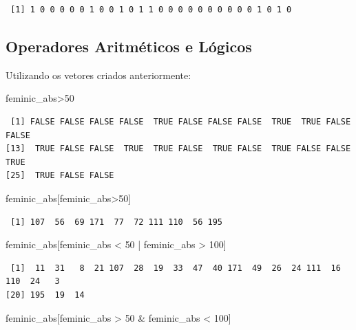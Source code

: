 \documentclass[
  letterpaper,
  DIV=11,
  numbers=noendperiod]{scrreprt}
\newenvironment{Shaded}{\begin{snugshade}}{\end{snugshade}}
\newcommand{\DecValTok}[1]{\textcolor[rgb]{0.68,0.00,0.00}{#1}}
\newcommand{\NormalTok}[1]{\textcolor[rgb]{0.00,0.23,0.31}{#1}}
\newcommand{\SpecialCharTok}[1]{\textcolor[rgb]{0.37,0.37,0.37}{#1}}
\begin{document}
\begin{verbatim}
 [1] 1 0 0 0 0 0 1 0 0 1 0 1 1 0 0 0 0 0 0 0 0 0 0 1 0 1 0
\end{verbatim}

\subsection{Operadores Aritméticos e
Lógicos}\label{operadores-aritmuxe9ticos-e-luxf3gicos}

Utilizando os vetores criados anteriormente:

\begin{Shaded}
\begin{Highlighting}[]
\NormalTok{feminic\_abs}\SpecialCharTok{\textgreater{}}\DecValTok{50}
\end{Highlighting}
\end{Shaded}

\begin{verbatim}
 [1] FALSE FALSE FALSE FALSE  TRUE FALSE FALSE FALSE  TRUE  TRUE FALSE FALSE
[13]  TRUE FALSE FALSE  TRUE  TRUE FALSE  TRUE FALSE  TRUE FALSE FALSE  TRUE
[25]  TRUE FALSE FALSE
\end{verbatim}

\begin{Shaded}
\begin{Highlighting}[]
\NormalTok{feminic\_abs[feminic\_abs}\SpecialCharTok{\textgreater{}}\DecValTok{50}\NormalTok{]}
\end{Highlighting}
\end{Shaded}

\begin{verbatim}
 [1] 107  56  69 171  77  72 111 110  56 195
\end{verbatim}

\begin{Shaded}
\begin{Highlighting}[]
\NormalTok{feminic\_abs[feminic\_abs }\SpecialCharTok{\textless{}} \DecValTok{50} \SpecialCharTok{|}\NormalTok{ feminic\_abs }\SpecialCharTok{\textgreater{}} \DecValTok{100}\NormalTok{]}
\end{Highlighting}
\end{Shaded}

\begin{verbatim}
 [1]  11  31   8  21 107  28  19  33  47  40 171  49  26  24 111  16 110  24   3
[20] 195  19  14
\end{verbatim}

\begin{Shaded}
\begin{Highlighting}[]
\NormalTok{feminic\_abs[feminic\_abs }\SpecialCharTok{\textgreater{}} \DecValTok{50} \SpecialCharTok{\&}\NormalTok{ feminic\_abs }\SpecialCharTok{\textless{}} \DecValTok{100}\NormalTok{]}
\end{Highlighting}
\end{Shaded}
\end{document}
